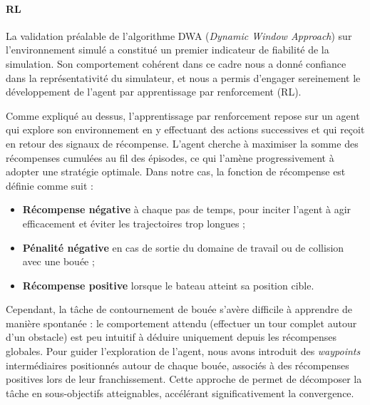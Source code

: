 %

\paragraph{RL}
La validation préalable de l'algorithme DWA (\textit{Dynamic Window Approach}) sur l'environnement simulé a constitué un premier indicateur de fiabilité de la simulation. Son comportement cohérent dans ce cadre nous a donné confiance dans la représentativité du simulateur, et nous a permis d'engager sereinement le développement de l'agent par apprentissage par renforcement (RL).

Comme expliqué au dessus, l'apprentissage par renforcement repose sur un agent qui explore son environnement en y effectuant des actions successives et qui reçoit en retour des signaux de récompense. L'agent cherche à maximiser la somme des récompenses cumulées au fil des épisodes, ce qui l'amène progressivement à adopter une stratégie optimale. Dans notre cas, la fonction de récompense est définie comme suit :

\begin{itemize}
\item \textbf{Récompense négative} à chaque pas de temps, pour inciter l'agent à agir efficacement et éviter les trajectoires trop longues ;
\item \textbf{Pénalité négative} en cas de sortie du domaine de travail ou de collision avec une bouée ;
\item \textbf{Récompense positive} lorsque le bateau atteint sa position cible.
\end{itemize}

Cependant, la tâche de contournement de bouée s'avère difficile à apprendre de manière spontanée : le comportement attendu (effectuer un tour complet autour d'un obstacle) est peu intuitif à déduire uniquement depuis les récompenses globales. Pour guider l'exploration de l'agent, nous avons introduit des \textit{waypoints} intermédiaires positionnés autour de chaque bouée, associés à des récompenses positives lors de leur franchissement. Cette approche de permet de décomposer la tâche en sous-objectifs atteignables, accélérant significativement la convergence.

